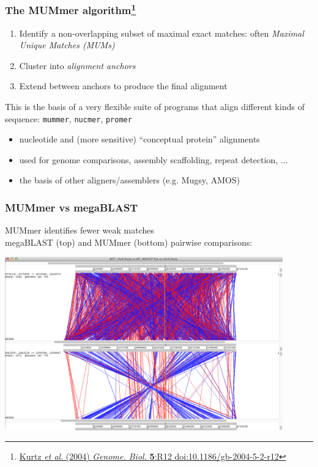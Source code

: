 \begin{frame}
  \frametitle{The MUMmer algorithm\footnote{\tiny{\href{http://dx.doi.org/10.1186/gb-2004-5-2-r12}{Kurtz \textit{et al}. (2004) \textit{Genome. Biol.} \textbf{5}:R12 doi:10.1186/gb-2004-5-2-r12}}}}
  \begin{enumerate}
    \item Identify a non-overlapping subset of maximal exact matches: often \textit{Maximal Unique Matches (MUMs)}
    \item Cluster into \textit{alignment anchors}
    \item Extend between anchors to produce the final alignment
  \end{enumerate}
  This is the basis of a very flexible suite of programs that align different kinds of sequence: \texttt{mummer}, \texttt{nucmer}, \texttt{promer}
  \begin{itemize}
    \item nucleotide and (more sensitive) ``conceptual protein'' alignments
    \item used for genome comparisons, assembly scaffolding, repeat detection, $\ldots$
    \item the basis of other aligners/assemblers (e.g. Mugsy, AMOS)
  \end{itemize}
\end{frame}

\begin{frame}
  \frametitle{MUMmer vs megaBLAST}
  MUMmer identifies fewer weak matches\\[0.2cm]
  megaBLAST (top) and MUMmer (bottom) pairwise comparisons:
  \begin{center}
    \includegraphics[width=0.9\textwidth]{images/act_wgs9}
  \end{center}    
\end{frame}

